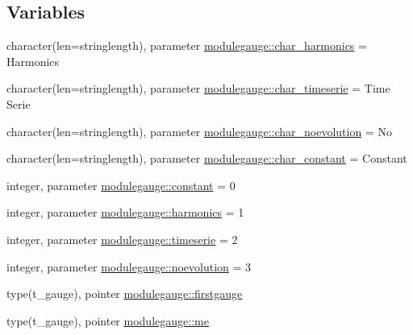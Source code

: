 \subsection*{Variables}
\begin{DoxyCompactItemize}
\item 
character(len=stringlength), parameter \mbox{\hyperlink{namespacemodulegauge_a94bb84dcdbe9bf7dec1cb0f6b3bffb5d}{modulegauge\+::char\+\_\+harmonics}} = \textquotesingle{}Harmonics\textquotesingle{}
\item 
character(len=stringlength), parameter \mbox{\hyperlink{namespacemodulegauge_ada4bd7e74d44c2a75f7fd3dabdaec4f6}{modulegauge\+::char\+\_\+timeserie}} = \textquotesingle{}Time Serie\textquotesingle{}
\item 
character(len=stringlength), parameter \mbox{\hyperlink{namespacemodulegauge_a6ba029f1e08fcbbbd5908ec2ae512c23}{modulegauge\+::char\+\_\+noevolution}} = \textquotesingle{}No\textquotesingle{}
\item 
character(len=stringlength), parameter \mbox{\hyperlink{namespacemodulegauge_ac3b02dcb0550cc2e7f9db1a1674271ff}{modulegauge\+::char\+\_\+constant}} = \textquotesingle{}Constant\textquotesingle{}
\item 
integer, parameter \mbox{\hyperlink{namespacemodulegauge_ae88c58ad24b474ec3b88eca9f0cfd3e1}{modulegauge\+::constant}} = 0
\item 
integer, parameter \mbox{\hyperlink{namespacemodulegauge_a3f8a746c3c0ad5da35fdd078a57a5cbb}{modulegauge\+::harmonics}} = 1
\item 
integer, parameter \mbox{\hyperlink{namespacemodulegauge_a44762d942d0bc35a4d1481c829c717ff}{modulegauge\+::timeserie}} = 2
\item 
integer, parameter \mbox{\hyperlink{namespacemodulegauge_a7fd89ac8c515f3952a0d3a804cbf6391}{modulegauge\+::noevolution}} = 3
\item 
type(t\+\_\+gauge), pointer \mbox{\hyperlink{namespacemodulegauge_a128d19f6ffe523671f625c16c81ba96a}{modulegauge\+::firstgauge}}
\item 
type(t\+\_\+gauge), pointer \mbox{\hyperlink{namespacemodulegauge_a6350897b91533283cb8bab27165a71fe}{modulegauge\+::me}}
\end{DoxyCompactItemize}
